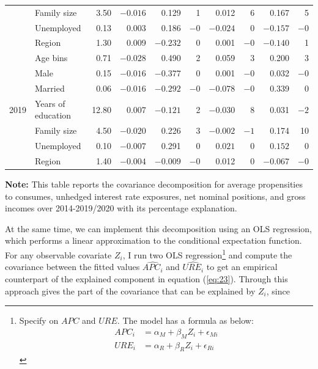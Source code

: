 \documentclass[11pt,letterpaper]{article}
\begin{document}
\begin{table}[h]
{\begin{tabular}{@{}llrrrrrrrr@{}}
			&Family size  &3.50&$-0.016$&0.129&1&0.012&6&0.167&5\\
			
			&Unemployed& 0.13&0.003&0.186&$-0$&$-0.024$&0&$-0.157$&$-0$\\
			
			&Region & 1.30&0.009&$-0.232$&0&0.001&$-0$&$-0.140$&1\\
			\hline
			
			\multirow{7}{*}{2019} &Age bins & 0.71 & $-0.028$&0.490&2&0.059&3& 0.200&3\\
			
			&Male &  0.15& $-0.016$ &$-0.377$&0&0.001&$-0$&0.032 &$-0$\\
			
			&Married  & 0.06&$-0.016$&$-0.292$&$-0$&$-0.078$&$-0$&0.339&0\\ 
			
			&Years of education & 12.80&0.007&$-0.121$&2&$-0.030$&8&0.031&$-2$\\
			
			&Family size  &4.50&$-0.020$&0.226&3&$-0.002$&$-1$&0.174&10\\
			
			&Unemployed& 0.10&$-0.007$&0.291&$0$&$0.021$&0&$0.152$&$0$\\
			
			&Region & 1.40&$-0.004$&$-0.009$&$-0$&0.012&$0$&$-0.067$&$-0$\\
			\hline \hline
		\end{tabular}%
	}
	\begin{tablenotes}
		\footnotesize
		\item \textbf{Note:} This table reports the covariance decomposition for average propensities to consumes, unhedged interest rate exposures, net nominal positions, and gross incomes over 2014-2019/2020 with its percentage explanation.   
	\end{tablenotes} 
	
\end{table}
At the same time, we can implement this decomposition using an OLS regression, which performs a linear approximation to the conditional expectation function. For any observable covariate $Z_{i}$, I run two OLS regression\footnote{Specify on $APC$ and $URE$. The model has a formula as below:
	\begin{align*}
		APC_{i} &= \alpha_{M} + \beta_{M}Z_{i} + \epsilon_{Mi} \\
		URE_{i} &= \alpha_{R} + \beta_{R}Z_{i} + \epsilon_{Ri}
\end{align*}} and compute the covariance between the fitted values $\widehat{APC_{i}}$ and $\widehat{URE_{i}}$ to get an empirical counterpart of the explained component in equation (\ref{eq:23}). Through this approach gives the part of the covariance that can be explained by $Z_{i}$, since
\end{document}
